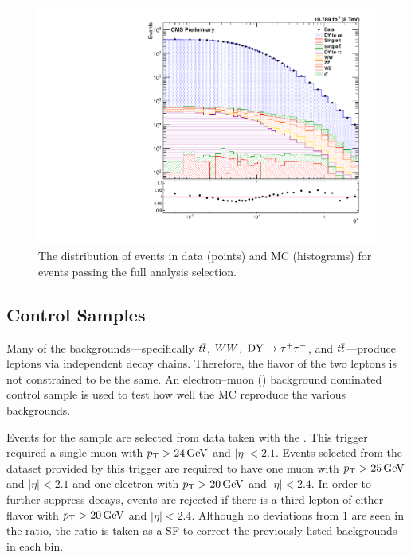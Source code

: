 \begin{figure}[!htbp]
    \centering
    \includegraphics[width=\textwidth]{figures/phistar.pdf}
    \caption{
        The \phistar distribution of events in data (points) and MC
        (histograms) for events passing the full analysis selection.
    }
    \label{fig:phistar_background}
\end{figure}

\subsection{\emu Control Samples}

Many of the backgrounds---specifically $t\overline{t}$, $WW$, $\text{DY} \to \tau^{+} \tau^{-}$, and
$t\overline{t}$---produce leptons via independent decay chains. Therefore, the flavor
of the two leptons is not constrained to be the same. An electron--muon
(\emu) background dominated control sample is used to test how well the MC
reproduce the various backgrounds.

Events for the \emu sample are selected from data taken with the
\SingleMuonTrigger. This trigger required a single muon with $p_{\mathrm{T}} > 24 \,\text{Ge\hspace{-.08em}V}$
and $|\eta| < 2.1$. Events selected from the dataset provided by this trigger
are required to have one muon with $p_{\mathrm{T}} > 25 \,\text{Ge\hspace{-.08em}V}$ and $|\eta| < 2.1$ and one
electron with $p_{\mathrm{T}} > 20 \,\text{Ge\hspace{-.08em}V}$ and $|\eta| < 2.4$. In order to further suppress
\Z decays, events are rejected if there is a third lepton of either flavor with
$p_{\mathrm{T}} > 20 \,\text{Ge\hspace{-.08em}V}$ and $|\eta| < 2.4$.  Although no
deviations from \num{1} are seen in the ratio, the ratio is taken as a SF to
correct the previously listed backgrounds in each bin.

